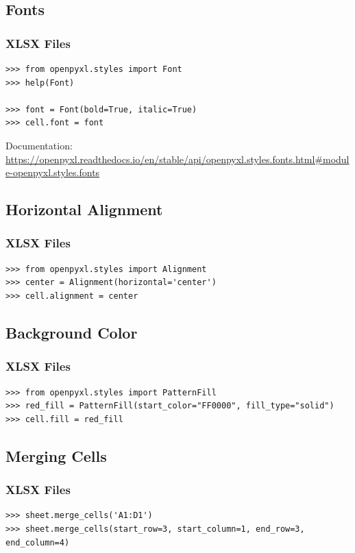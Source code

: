 {\subsection{Fonts}
\begin{frame}[fragile]
  \frametitle{XLSX Files }
  \vspace{3mm}
  \begin{verbatim}
>>> from openpyxl.styles import Font
>>> help(Font)

>>> font = Font(bold=True, italic=True)
>>> cell.font = font
  \end{verbatim}
  
  \pause
  \vspace{5mm}
  Documentation:\\
  \small{\url{https://openpyxl.readthedocs.io/en/stable/api/openpyxl.styles.fonts.html#module-openpyxl.styles.fonts}}
\end{frame}

\subsection{Horizontal Alignment}
\begin{frame}[fragile]
  \frametitle{XLSX Files }
  \vspace{3mm}
  \begin{verbatim}
>>> from openpyxl.styles import Alignment
>>> center = Alignment(horizontal='center')
>>> cell.alignment = center
  \end{verbatim}
\end{frame}

\subsection{Background Color}
\begin{frame}[fragile]
  \frametitle{XLSX Files }
  \vspace{3mm}
  \begin{verbatim}
>>> from openpyxl.styles import PatternFill
>>> red_fill = PatternFill(start_color="FF0000", fill_type="solid")
>>> cell.fill = red_fill
  \end{verbatim}
\end{frame}

\subsection{Merging Cells}
\begin{frame}[fragile]
  \frametitle{XLSX Files }
  \vspace{3mm}
  \begin{verbatim}
>>> sheet.merge_cells('A1:D1')
>>> sheet.merge_cells(start_row=3, start_column=1, end_row=3, end_column=4)
  \end{verbatim}
\end{frame}

}
